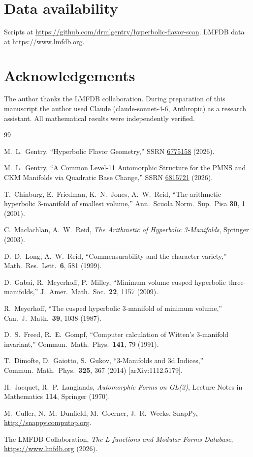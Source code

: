 \documentclass[11pt,a4paper]{article}
\theoremstyle{definition}
\begin{document}
\section*{Data availability}
Scripts at \url{https://github.com/drmlgentry/hyperbolic-flavor-scan}.
LMFDB data at \url{https://www.lmfdb.org}.

\section*{Acknowledgements}
The author thanks the LMFDB collaboration.
During preparation of this manuscript the author used Claude
(claude-sonnet-4-6, Anthropic) as a research assistant.
All mathematical results were independently verified.

\begin{thebibliography}{99}

M.~L.~Gentry,
``Hyperbolic Flavor Geometry,''
SSRN \href{https://doi.org/10.2139/ssrn.6775158}{6775158} (2026).

M.~L.~Gentry,
``A Common Level-11 Automorphic Structure for the PMNS and CKM
Manifolds via Quadratic Base Change,''
SSRN \href{https://doi.org/10.2139/ssrn.6815721}{6815721} (2026).

T.~Chinburg, E.~Friedman, K.~N.~Jones, A.~W.~Reid,
``The arithmetic hyperbolic 3-manifold of smallest volume,''
Ann.\ Scuola Norm.\ Sup.\ Pisa \textbf{30}, 1 (2001).

C.~Maclachlan, A.~W.~Reid,
\emph{The Arithmetic of Hyperbolic 3-Manifolds},
Springer (2003).

D.~D.~Long, A.~W.~Reid,
``Commensurability and the character variety,''
Math.\ Res.\ Lett.\ \textbf{6}, 581 (1999).

D.~Gabai, R.~Meyerhoff, P.~Milley,
``Minimum volume cusped hyperbolic three-manifolds,''
J.\ Amer.\ Math.\ Soc.\ \textbf{22}, 1157 (2009).

R.~Meyerhoff,
``The cusped hyperbolic 3-manifold of minimum volume,''
Can.\ J.\ Math.\ \textbf{39}, 1038 (1987).

D.~S.~Freed, R.~E.~Gompf,
``Computer calculation of Witten's 3-manifold invariant,''
Commun.\ Math.\ Phys.\ \textbf{141}, 79 (1991).

T.~Dimofte, D.~Gaiotto, S.~Gukov,
``3-Manifolds and 3d Indices,''
Commun.\ Math.\ Phys.\ \textbf{325}, 367 (2014)
[arXiv:1112.5179].

H.~Jacquet, R.~P.~Langlands,
\emph{Automorphic Forms on GL(2)},
Lecture Notes in Mathematics \textbf{114}, Springer (1970).

M.~Culler, N.~M.~Dunfield, M.~Goerner, J.~R.~Weeks,
SnapPy, \url{http://snappy.computop.org}.

The LMFDB Collaboration,
\emph{The $L$-functions and Modular Forms Database},
\url{https://www.lmfdb.org} (2026).

\end{thebibliography}
\end{document}
